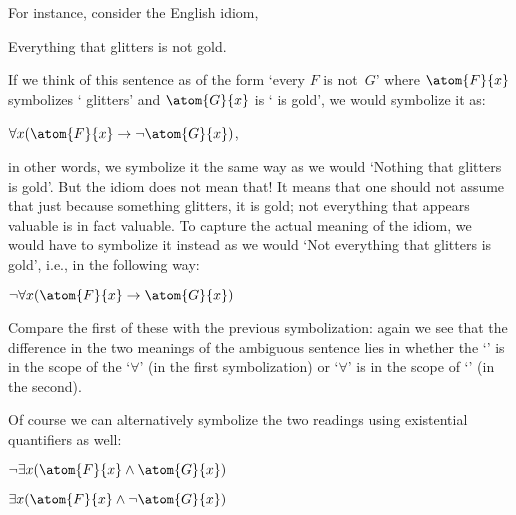For instance, consider the English idiom,
\begin{earg}
	\item[\ex{glitters}]
	Everything that glitters is not gold.
\end{earg}
If we think of this sentence as of the form `every $F$ is not~$G$' where $\atom{F}{x}$ symbolizes ` glitters' and $\atom{G}{x}$ is ` is gold', we would symbolize it as:
\begin{earg}
	\item[] $\forall x(\atom{F}{x} \eif \enot \atom{G}{x})$,
\end{earg}
in other words, we symbolize it the same way as we would `Nothing that glitters is gold'. But the idiom does not mean that! It means that one should not assume that just because something glitters, it is gold; not everything that appears valuable is in fact valuable.  To capture the actual meaning of the idiom, we would have to symbolize it instead as we would `Not everything that glitters is gold', i.e., in the following way:
\begin{earg}
	\item[] $\enot\forall x(\atom{F}{x} \eif \atom{G}{x})$
\end{earg}
Compare the first of these with the previous symbolization: again we see that the difference in the two meanings of the ambiguous sentence lies in whether the `\enot' is in the scope of the `$\forall$' (in the first symbolization) or `$\forall$' is in the scope of `\enot' (in the second).

Of course we can alternatively symbolize the two readings using existential quantifiers as well:
\begin{earg}
	\item[] $\enot\exists x(\atom{F}{x} \eand \atom{G}{x})$
	\item[] $\exists x(\atom{F}{x} \eand \enot \atom{G}{x})$
\end{earg}

